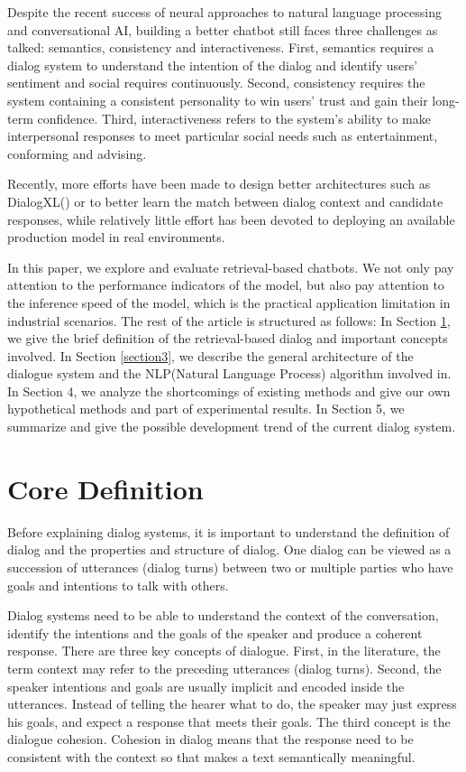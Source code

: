 \documentclass{article}
\begin{document}
Despite the recent success of neural approaches to natural language processing and conversational AI, building a better chatbot still faces three challenges as \cite{huang2020challenges} talked: semantics, consistency and interactiveness. First, semantics requires a dialog system to understand the intention of the dialog and identify users’ sentiment and social requires continuously. Second, consistency requires the system containing a consistent personality to win users’ trust and gain their long-term confidence. Third, interactiveness refers to the system’s ability to make interpersonal responses to meet particular social needs such as entertainment, conforming and advising. \par

Recently, more efforts have been made to design better architectures such as DialogXL(\cite{shen2020dialogxl}) or to better learn the match between dialog context and candidate responses, while relatively little effort has been devoted to deploying an available production model in real environments. \par

In this paper, we explore and evaluate retrieval-based chatbots. We not only pay attention to the performance indicators of the model, but also pay attention to the inference speed of the model, which is the practical application limitation in industrial scenarios. The rest of the article is structured as follows: In Section \ref{section2}, we give the brief definition of the retrieval-based dialog and important concepts involved. In Section \ref{section3}, we describe the general architecture of the dialogue system and the NLP(Natural Language Process) algorithm involved in. In Section 4, we analyze the shortcomings of existing methods and give our own hypothetical methods and part of experimental results. In Section 5, we summarize and give the possible development trend of the current dialog system.

\section{Core Definition}
\label{section2}

Before explaining dialog systems, it is important to understand the definition of dialog and the properties and structure of dialog. One dialog can be viewed as a succession of utterances (dialog turns) between two or multiple parties who have goals and intentions to talk with others.

Dialog systems need to be able to understand the context of the conversation, identify the intentions and the goals of the speaker and produce a coherent response. There are three key concepts of dialogue. First, in the literature, the term context may refer to the preceding utterances (dialog turns). Second, the speaker intentions and goals are usually implicit and encoded inside the utterances. Instead of telling the hearer what to do, the speaker may just express his goals, and expect a response that meets their goals. The third concept is the dialogue cohesion. Cohesion in dialog means that the response need to be consistent with the context so that makes a text semantically meaningful.
\end{document}
